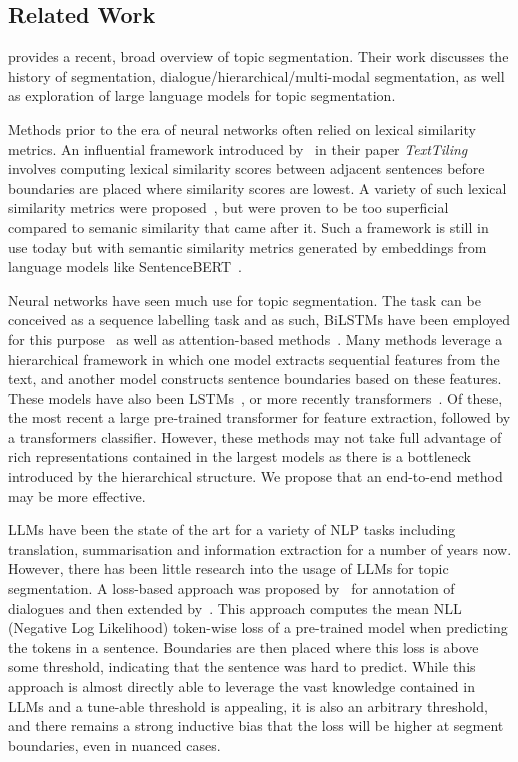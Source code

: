 \subsection{Related Work}

\citep{XingThesis} provides a recent, broad overview of topic segmentation. Their work discusses the history of segmentation, dialogue/hierarchical/multi-modal segmentation, as well as exploration of large language models for topic segmentation.

Methods prior to the era of neural networks often relied on lexical similarity metrics. An influential framework introduced by~\citep{TextTiling} in their paper \emph{TextTiling} involves computing lexical similarity scores between adjacent sentences before boundaries are placed where similarity scores are lowest. A variety of such lexical similarity metrics were proposed~\citep{lexical1,lexical2}, but were proven to be too superficial compared to semanic similarity that came after it. Such a framework is still in use today but with semantic similarity metrics generated by embeddings from language models like SentenceBERT~\citep{SentenceBERT}.

Neural networks have seen much use for topic segmentation. The task can be conceived as a sequence labelling task and as such, BiLSTMs have been employed for this purpose~\citep{BiLSTM} as well as attention-based methods~\cite{CrossAttentionHierarchical}. Many methods leverage a hierarchical framework in which one model extracts sequential features from the text, and another model constructs sentence boundaries based on these features. These models have also been LSTMs~\cite{HierarchicalBiLSTM,CNNFeaturesLSTMAttention}, or more recently transformers~\citep{TwoLevelTransformerSoftmax,TwoLevelTransformerPretrained}. Of these, the most recent a large pre-trained transformer for feature extraction, followed by a transformers classifier. However, these methods may not take full advantage of rich representations contained in the largest models as there is a bottleneck introduced by the hierarchical structure. We propose that an end-to-end  method may be more effective.

LLMs have been the state of the art for a variety of NLP tasks including translation, summarisation and information extraction for a number of years now. However, there has been little research into the usage of LLMs for topic segmentation. A loss-based approach was proposed by~\citep{DialoGPT} for annotation of dialogues and then extended by~\citep{XingThesis}. This approach computes the mean NLL (Negative Log Likelihood) token-wise loss of a pre-trained model when predicting the tokens in a sentence. Boundaries are then placed where this loss is above some threshold, indicating that the sentence was hard to predict. While this approach is almost directly able to leverage the vast knowledge contained in LLMs and a tune-able threshold is appealing, it is also an arbitrary threshold, and there remains a strong inductive bias that the loss will be higher at segment boundaries, even in nuanced cases.

